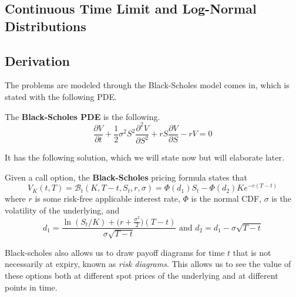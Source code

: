 \documentclass{article}
\begin{document}
  \subsection{Continuous Time Limit and Log-Normal Distributions}

  \subsection{Derivation}

  The problems are modeled through the Black-Scholes model comes in, which is stated with the following PDE.

  \begin{definition}
    The \textbf{Black-Scholes PDE} is the following. 
    \begin{equation}
      \frac{\partial V}{\partial t} + \frac{1}{2} \sigma^2 S^2 \frac{\partial^2 V}{\partial S^2} + r S \frac{\partial V}{\partial S} - rV = 0
    \end{equation}
  \end{definition}

  It has the following solution, which we will state now but will elaborate later. 

  \begin{definition}
    Given a call option, the \textbf{Black-Scholes} pricing formula states that 
    \begin{equation}
      V_K (t, T) = \mathcal{B}_t (K, T - t, S_t, r, \sigma) = \Phi(d_1) S_t - \Phi (d_2) K e^{-r (T - t)}
    \end{equation}
    where $r$ is some risk-free applicable interest rate, $\Phi$ is the normal CDF, $\sigma$ is the volatility of the underlying, and 
    \begin{equation}
      d_1 = \frac{\ln (S_t / K) + \big( r + \frac{\sigma^2}{2}\big) (T - t)}{\sigma \sqrt{T - t}} \text{ and } d_2 = d_1 - \sigma \sqrt{T - t}
    \end{equation}
  \end{definition}

  Black-scholes also allows us to draw payoff diagrams for time $t$ that is not necessarily at expiry, known as \textit{risk diagrams}. This allows us to see the value of these options both at different spot prices of the underlying and at different points in time. 
\end{document}
